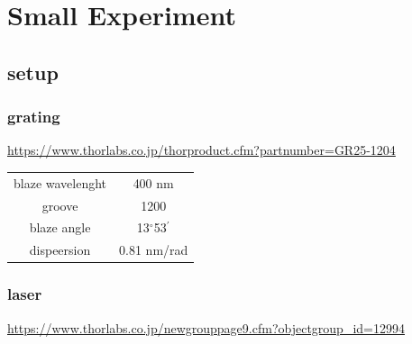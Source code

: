 \documentclass[a4paper,11pt,uplatex]{jsarticle}
\begin{document}
\section{Small Experiment}
\subsection*{setup}
\subsubsection*{grating}
\url{https://www.thorlabs.co.jp/thorproduct.cfm?partnumber=GR25-1204}
\begin{table}[h]
\centering
\begin{tabular}{c|c}
  blaze wavelenght & 400 nm \\
  groove & 1200 \\
  blaze angle & 13$^\circ$53$^{'}$ \\
  dispeersion & 0.81 nm/rad
\end{tabular}
\end{table}

\subsubsection*{laser}
\url{https://www.thorlabs.co.jp/newgrouppage9.cfm?objectgroup_id=12994}
\end{document}
